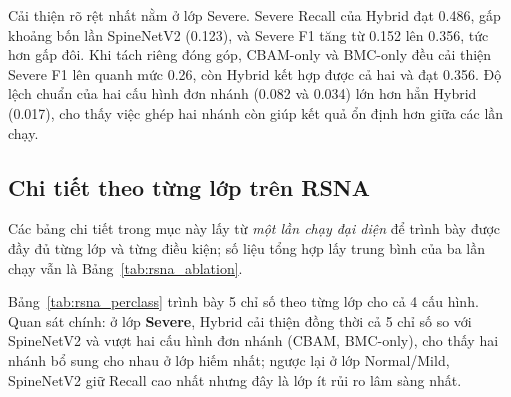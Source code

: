 Cải thiện rõ rệt nhất nằm ở lớp Severe. Severe Recall của Hybrid đạt 0.486, gấp khoảng bốn lần SpineNetV2 (0.123), và Severe F1 tăng từ 0.152 lên 0.356, tức hơn gấp đôi. Khi tách riêng đóng góp, CBAM-only và BMC-only đều cải thiện Severe F1 lên quanh mức 0.26, còn Hybrid kết hợp được cả hai và đạt 0.356. Độ lệch chuẩn của hai cấu hình đơn nhánh (0.082 và 0.034) lớn hơn hẳn Hybrid (0.017), cho thấy việc ghép hai nhánh còn giúp kết quả ổn định hơn giữa các lần chạy.

\subsection{Chi tiết theo từng lớp trên RSNA}
\label{subsec:rsna_perclass}

Các bảng chi tiết trong mục này lấy từ \emph{một lần chạy đại diện} để trình bày được đầy đủ từng lớp và từng điều kiện; số liệu tổng hợp lấy trung bình của ba lần chạy vẫn là Bảng~\ref{tab:rsna_ablation}.


Bảng~\ref{tab:rsna_perclass} trình bày 5 chỉ số theo từng lớp cho cả 4 cấu hình. Quan sát chính: ở lớp \textbf{Severe}, Hybrid cải thiện đồng thời cả 5 chỉ số so với SpineNetV2 và vượt hai cấu hình đơn nhánh (CBAM, BMC-only), cho thấy hai nhánh bổ sung cho nhau ở lớp hiếm nhất; ngược lại ở lớp Normal/Mild, SpineNetV2 giữ Recall cao nhất nhưng đây là lớp ít rủi ro lâm sàng nhất.

